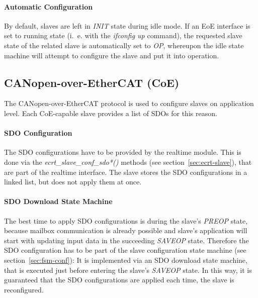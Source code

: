 \documentclass[a4paper,12pt,BCOR6mm,bibtotoc,idxtotoc]{scrbook}
\begin{document}
\paragraph{Automatic Configuration}

By default, slaves are left in \textit{INIT} state during idle mode.
If an EoE interface is set to running state (i.~e. with the
\textit{ifconfig up} command), the requested slave state of the
related slave is automatically set to \textit{OP}, whereupon the idle
state machine will attempt to configure the slave and put it into
operation.


\subsection{CANopen-over-EtherCAT (CoE)}
\label{sec:coeimp}

The CANopen-over-EtherCAT protocol \cite[section~5.6]{alspec} is used
to configure slaves on application level. Each CoE-capable slave
provides a list of SDOs for this reason.

\paragraph{SDO Configuration}

The SDO configurations have to be provided by the realtime module.
This is done via the \textit{ecrt\_slave\_conf\_sdo*()} methods (see
section~\ref{sec:ecrt-slave}), that are part of the realtime
interface. The slave stores the SDO configurations in a linked list,
but does not apply them at once.

\paragraph{SDO Download State Machine}

The best time to apply SDO configurations is during the slave's
\textit{PREOP} state, because mailbox communication is already
possible and slave's application will start with updating input data
in the succeeding \textit{SAVEOP} state. Therefore the SDO
configuration has to be part of the slave configuration state machine
(see section~\ref{sec:fsm-conf}): It is implemented via an SDO
download state machine, that is executed just before entering the
slave's \textit{SAVEOP} state. In this way, it is guaranteed that the
SDO configurations are applied each time, the slave is reconfigured.
\end{document}
